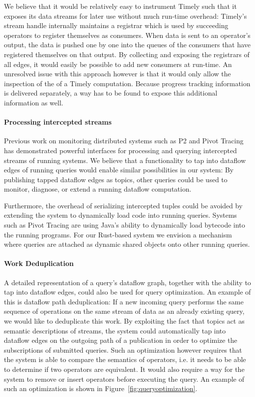 We believe that it would be relatively easy to instrument Timely such
that it exposes its data streams for later use without much run-time
overhead: Timely's stream handle internally maintains a registrar which
is used by succeeding operators to register themselves as consumers.
When data is sent to an operator's output, the data is pushed one by one into the
queues of the consumers that have registered themselves on that output. By collecting and exposing
the registrars of all edges, it would easily be possible to add new consumers
at run-time. An unresolved issue with this approach however is that it would only allow
the inspection of the  of a Timely computation. Because
progress tracking information is delivered separately, a way has to be found to
expose this additional information as well.

\paragraph{Processing intercepted streams}

Previous work on monitoring distributed systems such as P2 \cite{p2} and
Pivot Tracing \cite{pivot} has demonstrated powerful interfaces for
processing and querying intercepted streams of running systems.
We believe that a functionality to tap into dataflow edges of running queries would
enable similar possibilities in our system: By publishing tapped
dataflow edges as topics, other queries could be used to monitor, diagnose, or
extend a running dataflow computation.

Furthermore, the overhead of serializing intercepted tuples could be avoided
by extending the system to dynamically load code into running queries. Systems
such as Pivot Tracing are using Java's ability to dynamically load
bytecode into the running programs. For our Rust-based system we envision a
mechanism where queries are attached as dynamic shared objects onto other
running queries.

\paragraph{Work Deduplication}

A detailed representation of a query's dataflow graph, together with the ability
to tap into dataflow edges, could also be used for query optimization. An example
of this is dataflow path deduplication: If a new incoming query performs the same
sequence of operations on the same stream of data as an already existing
query, we would like to deduplicate this work. By exploiting the fact that
topics act as semantic descriptions of streams, the system could automatically
tap into dataflow edges on the outgoing path of a publication in order to
optimize the subscriptions of submitted queries. Such an optimization however
requires that the system is able to compare the semantics of operators,
i.e. it needs to be able to determine if two operators are equivalent. It
would also require a way for the system to remove or insert operators before
executing the query.
An example of such an optimization is shown in Figure~\ref{fig:queryoptimization}.


